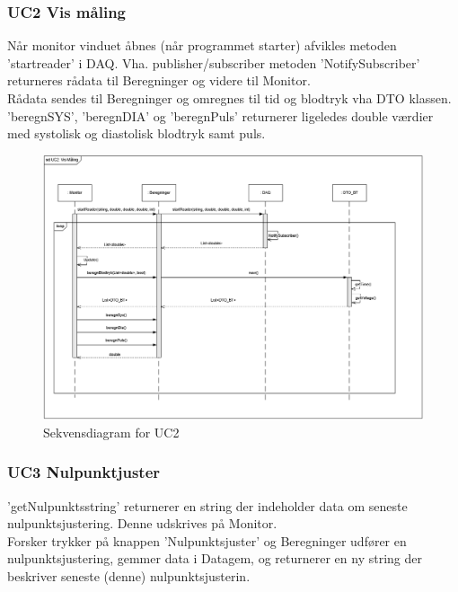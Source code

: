 \subsubsection{UC2 Vis måling}
Når monitor vinduet åbnes (når programmet starter) afvikles metoden 'startreader' i DAQ. Vha. publisher/subscriber metoden 'NotifySubscriber' returneres rådata til Beregninger og videre til Monitor.\\
Rådata sendes til Beregninger og omregnes til tid og blodtryk vha DTO klassen.
'beregnSYS', 'beregnDIA' og 'beregnPuls' returnerer ligeledes double værdier med systolisk og diastolisk blodtryk samt puls.
\begin{figure}[H]
	\centering
	\includegraphics[width=1\textwidth]{Figurer/UC2_SD_SW}
	\caption{Sekvensdiagram for UC2}
\end{figure}

\subsubsection{UC3 Nulpunktjuster}
'getNulpunktsstring' returnerer en string der indeholder data om seneste nulpunktsjustering. Denne udskrives på Monitor.\\
Forsker trykker på knappen 'Nulpunktsjuster' og Beregninger udfører en nulpunktsjustering, gemmer data i Datagem, og returnerer en ny string der beskriver seneste (denne) nulpunktsjusterin.

